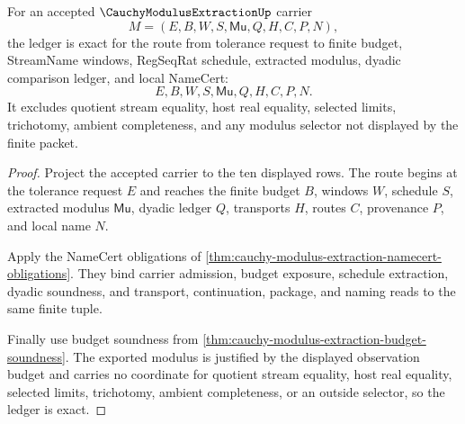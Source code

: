 \begin{theorem}
\label{thm:cauchy-modulus-extraction-ledger-exactness}
For an accepted $\CauchyModulusExtractionUp$ carrier
$$
M=(E,B,W,S,\mathsf{Mu},Q,H,C,P,N),
$$
the ledger is exact for the route from tolerance request to finite budget, StreamName windows, RegSeqRat schedule, extracted modulus, dyadic comparison ledger, and local NameCert:
$$
E,B,W,S,\mathsf{Mu},Q,H,C,P,N.
$$
It excludes quotient stream equality, host real equality, selected limits, trichotomy, ambient completeness, and any modulus selector not displayed by the finite packet.
\end{theorem}
\begin{proof}
Project the accepted carrier to the ten displayed rows. The route begins at the tolerance request $E$ and reaches the finite budget $B$, windows $W$, schedule $S$, extracted modulus $\mathsf{Mu}$, dyadic ledger $Q$, transports $H$, routes $C$, provenance $P$, and local name $N$.

Apply the NameCert obligations of \autoref{thm:cauchy-modulus-extraction-namecert-obligations}. They bind carrier admission, budget exposure, schedule extraction, dyadic soundness, and transport, continuation, package, and naming reads to the same finite tuple.

Finally use budget soundness from \autoref{thm:cauchy-modulus-extraction-budget-soundness}. The exported modulus is justified by the displayed observation budget and carries no coordinate for quotient stream equality, host real equality, selected limits, trichotomy, ambient completeness, or an outside selector, so the ledger is exact.
\end{proof}

